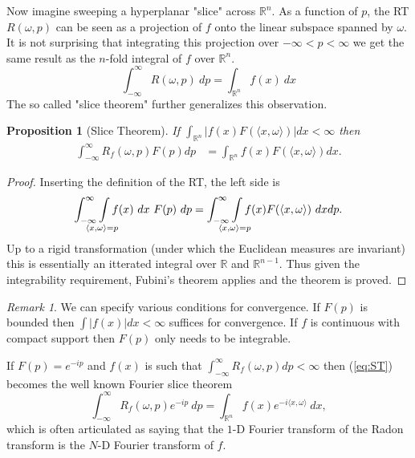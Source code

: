 \documentclass{amsart}
\newtheorem{proposition}[theorem]{Proposition}
\theoremstyle{remark}
\newtheorem{remark}[theorem]{Remark}
\numberwithin{equation}{section}
\newcommand{\RR}{\mathbb{R}}
\def\mclimits_#1{\limits_{\mathclap{#1}}}
\begin{document}
Now imagine sweeping a hyperplanar "slice" across $\RR^n$. As a function of $p$, the RT $R(\omega, p)$ can be seen as a projection of $f$ onto the linear subspace spanned by $\omega$. It is not surprising that integrating this projection over $-\infty < p < \infty$ we get the same result as the $n$-fold integral of $f$ over $\RR^n$.
\[
    \int_{-\infty}^\infty R(\omega, p) ~dp = \int_{\RR^n} f(x) ~dx
\]
The so called "slice theorem" further generalizes this observation.
\begin{proposition}[Slice Theorem]
    If $\int_{\mathbb{R}^n} |f(x) F(\langle x, \omega \rangle)| dx < \infty$ then
    \begin{align}
        \label{eq:ST}
        \int_{-\infty}^\infty R_f(\omega, p) F(p) dp 
        &= \int_{\mathbb{R}^n} f(x) F(\langle x, \omega \rangle) dx.
    \end{align}
\end{proposition}

\begin{proof}
Inserting the definition of the RT, the left side is
\[
    \int_{-\infty}^\infty \int\mclimits_{\langle x, \omega \rangle = p} f(x) ~dx~ F(p) ~dp 
    = \int_{-\infty}^\infty \int\mclimits_{\langle x, \omega \rangle = p} f(x) F(\langle x, \omega \rangle) ~dx dp.
\]
Up to a rigid transformation (under which the Euclidean measures are invariant) this is essentially an itterated integral over $\RR$ and $\RR^{n-1}$. Thus given the integrability requirement, Fubini's theorem applies and the theorem is proved.
\end{proof}
\begin{remark}
We can specify various conditions for convergence. If $F(p)$ is bounded then $\int |f(x)| dx < \infty$ suffices for convergence. If $f$ is continuous with compact support then $F(p)$ only needs to be integrable.  
\end{remark}

If $F(p) = e^{-ip}$ and $f(x)$ is such that $\int_{-\infty}^\infty R_f(\omega, p) dp < \infty$ then (\ref{eq:ST}) becomes the well known Fourier slice theorem
\[
    \int_{-\infty}^\infty R_f(\omega, p) e^{-ip} ~dp
    = \int_{\mathbb{R}^n} f(x) e^{-i\langle x, \omega\rangle} ~dx,
\]
which is often articulated as saying that the $1$-D Fourier transform of the Radon transform is the $N$-D Fourier transform of $f$.
\end{document}
